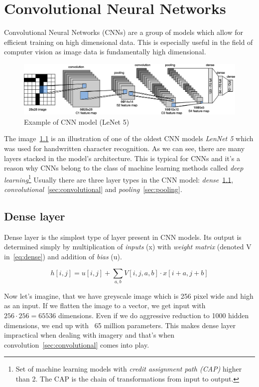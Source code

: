 \chapter{Convolutional Neural Networks}\label{ch:cnn}
Convolutional Neural Networks (CNNs) are a group of models which allow for efficient training on high dimensional data.
This is especially useful in the field of computer vision as image data is fundamentally high dimensional.

\begin{figure}[H]
    \centering
    \includegraphics[width=\columnwidth]{images/cnn/lenet.eps}
    \caption{Example of CNN model (LeNet 5)~\cite{CNN}}
    \label{fig:cnn}
\end{figure}

The image~\ref{fig:cnn} is an illustration of one of the oldest CNN models \textit{LenNet 5} which was used for
handwritten character recognition.
As we can see, there are many layers stacked in the model's architecture.
This is typical for CNNs and it's a reason why CNNs belong to the class of machine learning methods called
\textit{deep learning}\footnote{Set of machine learning models with
\textit{credit assignment path (CAP)} higher than 2.
The CAP is the chain of transformations from input to output.}
Usually there are three layer types in the CNN model: \textit{dense}~\ref{sec:dense},
\textit{convolutional}~\ref{sec:convolutional} and \textit{pooling}~\ref{sec:pooling}.

\section{Dense layer}\label{sec:dense}
Dense layer is the simplest type of layer present in CNN models.
Its output is determined simply by multiplication of \textit{inputs} (x) with \textit{weight matrix}
(denoted V in~\ref{eq:dense}) and addition of \textit{bias} (u).

\begin{equation}\label{eq:dense}
    h[i, j] = u[i,j] + \sum_{a,b} V[i,j,a,b] \cdot x[i+a,j+b]
\end{equation}

Now let's imagine, that we have greyscale image which is 256 pixel wide and high as an input.
If we flatten the image to a vector, we get input with $256\cdot256 = 65536$ dimensions.
Even if we do aggressive reduction to 1000 hidden dimensions, we end up with ~65 million parameters.
This makes dense layer impractical when dealing with imagery and that's when convolution~\ref{sec:convolutional} comes
into play.

